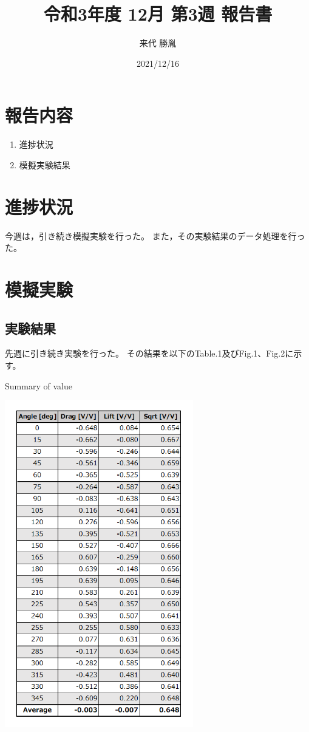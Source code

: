 \documentclass[twocolumn,a4j]{jsarticle}
\author{来代 勝胤}
\title{令和3年度 12月 第3週 報告書}
\date{2021/12/16}
\begin{document}
\columnseprule=0.1mm

\maketitle
\section*{報告内容}
\begin{enumerate}[1.]
    \item 進捗状況
    \item 模擬実験結果
\end{enumerate}

\section{進捗状況}
今週は，引き続き模擬実験を行った。
また，その実験結果のデータ処理を行った。

\section{模擬実験}

\subsection{実験結果}
先週に引き続き実験を行った。
その結果を以下のTable.1及びFig.1、Fig.2に示す。

\begin{table}[htbp]
    \begin{center}
        \caption{Summary of value}
        \includegraphics[width=82mm]{../images/table_1.png}
    \end{center}
\end{table}
\end{document}
